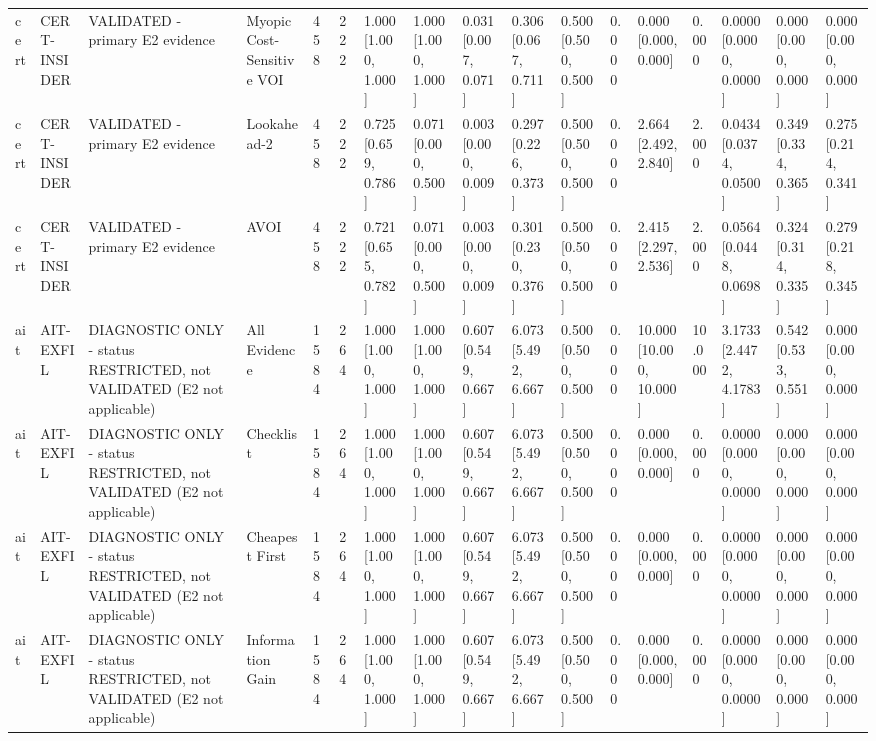 \begin{table}[!ht]
{\begin{tabular}{lllllllllllllllll}
cert & CERT-INSIDER & VALIDATED - primary E2 evidence & Myopic Cost-Sensitive VOI & 458 & 222 & 1.000 [1.000, 1.000] & 1.000 [1.000, 1.000] & 0.031 [0.007, 0.071] & 0.306 [0.067, 0.711] & 0.500 [0.500, 0.500] & 0.000 & 0.000 [0.000, 0.000] & 0.000 & 0.0000 [0.0000, 0.0000] & 0.000 [0.000, 0.000] & 0.000 [0.000, 0.000] \\
cert & CERT-INSIDER & VALIDATED - primary E2 evidence & Lookahead-2 & 458 & 222 & 0.725 [0.659, 0.786] & 0.071 [0.000, 0.500] & 0.003 [0.000, 0.009] & 0.297 [0.226, 0.373] & 0.500 [0.500, 0.500] & 0.000 & 2.664 [2.492, 2.840] & 2.000 & 0.0434 [0.0374, 0.0500] & 0.349 [0.334, 0.365] & 0.275 [0.214, 0.341] \\
cert & CERT-INSIDER & VALIDATED - primary E2 evidence & AVOI & 458 & 222 & 0.721 [0.655, 0.782] & 0.071 [0.000, 0.500] & 0.003 [0.000, 0.009] & 0.301 [0.230, 0.376] & 0.500 [0.500, 0.500] & 0.000 & 2.415 [2.297, 2.536] & 2.000 & 0.0564 [0.0448, 0.0698] & 0.324 [0.314, 0.335] & 0.279 [0.218, 0.345] \\
ait & AIT-EXFIL & DIAGNOSTIC ONLY - status RESTRICTED, not VALIDATED (E2 not applicable) & All Evidence & 1584 & 264 & 1.000 [1.000, 1.000] & 1.000 [1.000, 1.000] & 0.607 [0.549, 0.667] & 6.073 [5.492, 6.667] & 0.500 [0.500, 0.500] & 0.000 & 10.000 [10.000, 10.000] & 10.000 & 3.1733 [2.4472, 4.1783] & 0.542 [0.533, 0.551] & 0.000 [0.000, 0.000] \\
ait & AIT-EXFIL & DIAGNOSTIC ONLY - status RESTRICTED, not VALIDATED (E2 not applicable) & Checklist & 1584 & 264 & 1.000 [1.000, 1.000] & 1.000 [1.000, 1.000] & 0.607 [0.549, 0.667] & 6.073 [5.492, 6.667] & 0.500 [0.500, 0.500] & 0.000 & 0.000 [0.000, 0.000] & 0.000 & 0.0000 [0.0000, 0.0000] & 0.000 [0.000, 0.000] & 0.000 [0.000, 0.000] \\
ait & AIT-EXFIL & DIAGNOSTIC ONLY - status RESTRICTED, not VALIDATED (E2 not applicable) & Cheapest First & 1584 & 264 & 1.000 [1.000, 1.000] & 1.000 [1.000, 1.000] & 0.607 [0.549, 0.667] & 6.073 [5.492, 6.667] & 0.500 [0.500, 0.500] & 0.000 & 0.000 [0.000, 0.000] & 0.000 & 0.0000 [0.0000, 0.0000] & 0.000 [0.000, 0.000] & 0.000 [0.000, 0.000] \\
ait & AIT-EXFIL & DIAGNOSTIC ONLY - status RESTRICTED, not VALIDATED (E2 not applicable) & Information Gain & 1584 & 264 & 1.000 [1.000, 1.000] & 1.000 [1.000, 1.000] & 0.607 [0.549, 0.667] & 6.073 [5.492, 6.667] & 0.500 [0.500, 0.500] & 0.000 & 0.000 [0.000, 0.000] & 0.000 & 0.0000 [0.0000, 0.0000] & 0.000 [0.000, 0.000] & 0.000 [0.000, 0.000] \\

\end{tabular}}
\end{table}
